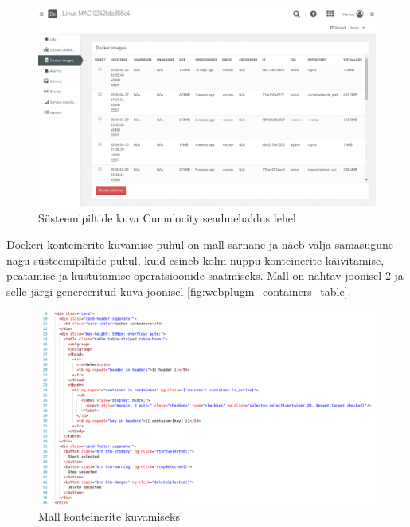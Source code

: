 \documentclass[12pt]{article}
\begin{document}
 \begin{figure} [ht] %
 \begin{center}
 \includegraphics[width=1\textwidth]{webplugin_images}
 \caption{Süsteemipiltide kuva Cumulocity seadmehaldus lehel}
 \label{fig:webplugin_images}
 \end{center}
 \end{figure}
 
 \FloatBarrier
 
 Dockeri konteinerite kuvamise puhul on mall sarnane ja näeb välja samasugune
 nagu süsteemipiltide puhul, kuid esineb kolm nuppu
 konteinerite käivitamise, peatamise ja kustutamise operatsioonide saatmiseks. 
 Mall on nähtav joonisel \ref{fig:webplugin_containers_table_template} ja selle järgi
 genereeritud kuva joonisel \ref{fig:webplugin_containers_table}.

 
 \begin{figure} [ht] %
 \begin{center}
 \includegraphics[width=1\textwidth]{webplugin_containers_table_template}
 \caption{Mall konteinerite kuvamiseks}
 \label{fig:webplugin_containers_table_template}
 \end{center}
 \end{figure}
 
\end{document}
